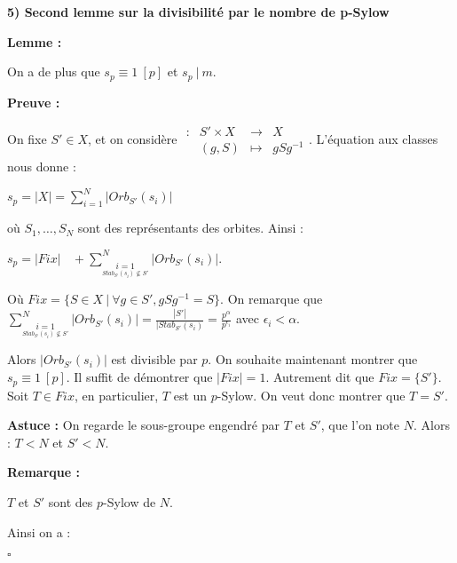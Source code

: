 \documentclass{report}
\renewenvironment{leftbar}{%
  \def\FrameCommand{\vrule width 0.4pt \hspace{10pt}}%
  \MakeFramed {\advance\hsize-\width \FrameRestore}}%
 {\endMakeFramed}%
\newenvironment{preuve}{\vspace*{0.5cm}
    \begin{leftbar}
    \noindent\textbf{Preuve :}\par}{
    \begin{flushright}
    $\square$
    \end{flushright}
    \end{leftbar}
}
\newenvironment{lemme}[2][white]{\begin{tcolorbox}[colframe= #1]
    \textbf{Lemme :} #2  \par}
    {\end{tcolorbox}}
\newcommand{\remarque}{
    \noindent\textbf{Remarque :} \par
}
\newcommand{\fonction}[5]{
    \begin{array}{l|rcl}
    #1: & #2 & \longrightarrow & #3 \\
        & #4 & \longmapsto & #5 
    \end{array}
}
\begin{document}
        \textbf{5) Second lemme sur la divisibilité par le nombre de p-Sylow}
        \begin{lemme}{}
        	On a de plus que $s_p \equiv 1 ~[p]$ et $s_p~|~m$.
        \end{lemme}
    
        
        
        
        \begin{preuve}
            On fixe $S'\in X$, et on considère $\fonction{}{S' \times X}{X}{(g,S)}{gSg^{-1}}$. L'équation aux classes nous donne : 
        
            \begin{center}
                $s_p= |X| = \displaystyle \sum ^N _{i=1}|Orb_{S'}(s_i)|$
        
            \end{center}
        
            où $S_1, \dots, S_N$ sont des représentants des orbites. Ainsi :
        
            \begin{center}
                $s_p=|Fix|~~~~+\displaystyle \sum ^N _{\underset{Stab_{S'}(s_i)\nsubseteq S'}{i=1}}|Orb_{S'}(s_i)|$.
            \end{center}
        
            Où $Fix = \{ S \in X ~|~\forall g \in S', gSg^{-1} =S\}$. \newline On remarque que \hspace{-5mm} $\displaystyle \sum ^N _{\underset{Stab_{S'}(s_i)\nsubseteq S'}{i=1}}\! \! \! \! \! \!  \! \!  \! \! |Orb_{S'}(s_i)| = \frac{|S'|}{|Stab_{S'}(s_i)}=\frac{p^\alpha}{p^{\epsilon _i}}$ avec $\epsilon_i < \alpha$. 
            
            
        
            Alors $|Orb_{S'}(s_i)|$ est divisible par $p$. On souhaite maintenant montrer que $s_p \equiv 1 ~[p]$. Il suffit de démontrer que $|Fix | =1$. Autrement dit que $Fix = \{S'\}$. Soit $T\in Fix$, en particulier, $T$ est un $p$-Sylow. On veut donc montrer que $T = S'$.
        
            \bigbreak
        
            \textbf{Astuce :} On regarde le sous-groupe engendré par $T$ et $S'$, que l'on note $N$. Alors : $T <N$ et $S'<N$.
        
            \remarque $T$ et $S'$ sont des $p$-Sylow de $N$. 
    
            \bigbreak Ainsi on a : 
        

\end{preuve}
\end{document}
